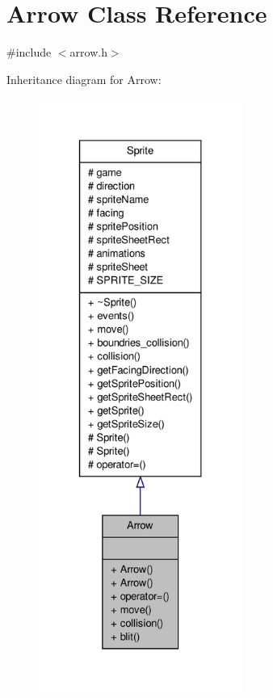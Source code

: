 \hypertarget{classArrow}{\section{Arrow Class Reference}
\label{classArrow}
}


{\ttfamily \#include $<$arrow.\-h$>$}



Inheritance diagram for Arrow\-:\nopagebreak
\begin{figure}[H]
\begin{center}
\leavevmode
\includegraphics[height=550pt]{classArrow__inherit__graph}
\end{center}
\end{figure}


